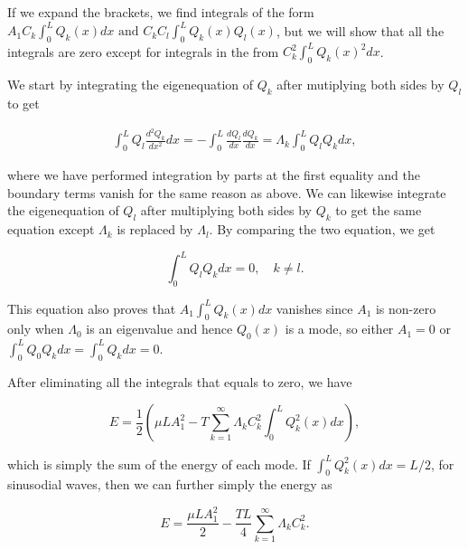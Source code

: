 \documentclass[a4paper,12pt]{report}
\begin{document}
If we expand the brackets, we find integrals of the form \(A_1 C_{k} \int_{0}^{L} Q_{k}(x)dx \text { and } C_{k} C_{l} \int_{0}^{L} Q_{k} (x)Q_{l}(x)    \), but we will show that all the integrals are zero except for integrals in the from \(C_{k}^2\int_{0}^{L} Q_{k}(x)^2dx   \). 

We start by integrating the eigenequation of \(Q_{k} \)  after mutiplying both sides by \(Q_{l} \) to get 

\begin{equation}
	\begin{aligned}
		\int_{0}^{L} Q_{l} \frac{d^2Q_{k} }{dx^2} dx = - \int_{0}^{L} \frac{dQ_{l} }{dx}\frac{dQ_{k} }{dx} = \Lambda _{k} \int_{0}^{L} Q_{l} Q_{k} dx, 
	\end{aligned}
\end{equation}

where we have performed integration by parts at the first equality and the boundary terms vanish for the same reason as above. We can likewise integrate the eigenequation of \(Q_{l} \) after multiplying both sides by \(Q_{k} \) to get the same equation except \(\Lambda _{k} \) is replaced by \(\Lambda _{l} \). By comparing the two equation, we get

\begin{equation}
	\int_{0}^{L} Q_{l} Q_{k} dx =0, \quad k \neq l.   
\end{equation}

This equation also proves that \(A_1 \int_{0}^{L} Q_{k} (x) dx \) vanishes since \(A_1 \) is non-zero only when \(\Lambda _{0} \) is an eigenvalue and hence \(Q_{0}(x) \) is a mode, so either \(A_1 =0\) or \(\int_{0}^{L} Q_{0}Q_{k} dx= \int_{0}^{L} Q_{k} dx = 0  \). 

After eliminating all the integrals that equals to zero, we have 

\begin{equation}
	E = \frac{1}{2} \left( \mu LA_1 ^2 - T \sum_{k=1}^{\infty} \Lambda _{k}C_{k}^2\int_{0}^{L}Q_{k}^2(x) dx       \right),  
\end{equation}

which is simply the sum of the energy of each mode. If \(\int_{0}^{L} Q_{k}^2(x) dx = L /2     \), for sinusodial waves, then we can further simply the energy as 

\begin{equation}
	E = \frac{\mu LA_1 ^2}{2} - \frac{TL}{4}\sum_{k=1}^{\infty}\Lambda _{k}C_{k}^2.     
\end{equation}
\end{document}
